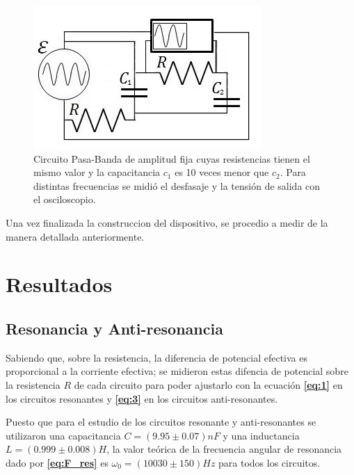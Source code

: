\documentclass[11pt,a4paper]{article}
\begin{document}
\begin{figure}[h]
\centering
\includegraphics[scale=0.8]{Circuito-RC-Pasa-Banda}
  \caption{Circuito Pasa-Banda de amplitud fija cuyas resistencias tienen el mismo valor y la capacitancia $c_{1}$ es 10 veces menor que $c_{2}$. Para distintas frecuencias se midió el desfasaje y la tensión de salida con el osciloscopio.}
  \label{fig:RC-PBD}
\end{figure}

Una vez finalizada la construccion del dispositivo, se procedio a medir de la manera detallada anteriormente.



\section{Resultados}


\subsection{Resonancia y Anti-resonancia}

Sabiendo que, sobre la resistencia, la diferencia de potencial efectiva es proporcional a la corriente efectiva; se midieron estas difencia de potencial sobre la resistencia $R$ de cada circuito para poder ajustarlo con la ecuación \textbf{\eqref{eq:1}} en los circuitos resonantes y \textbf{\eqref{eq:3}} en los circuitos anti-resonantes.  

Puesto que para el estudio de los circuitos resonante y anti-resonantes se utilizaron una capacitancia $C= (9.95 \pm 0.07)nF$ y una inductancia $L= (0.999 \pm 0.008) H$, la valor teórica de la frecuencia angular de resonancia dado por \textbf{\eqref{eq:F_res}} es $\omega_{0}=(10030 \pm 150) Hz$ para todos los circuitos.
\end{document}
